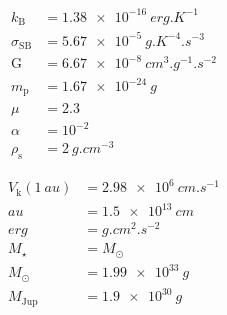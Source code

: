 \begin{multicols}{2}
 \begin{align}
  k_\mathrm{B}       & = \SI{1.38e-16}{erg.K^{-1}}        \\
  \sigma_\mathrm{SB} & = \SI{5.67e-5}{g.K^{-4}.s^{-3}}    \\
  \mathrm{G}         & = \SI{6.67e-8}{cm^3.g^{-1}.s^{-2}} \\
  m_\mathrm{p}       & = \SI{1.67e-24}{g}                 \\
  \mu                & = 2.3                              \\
  \alpha             & = 10^{-2}                          \\
  \rho_\mathrm{s}    & = \SI{2}{g.cm^{-3}}                
 \end{align}
 
 \begin{align}
  V_\mathrm{k}(\SI{1}{au}) & = \SI{2.98e6}{cm.s^{-1}} \\
  \si{au}                  & = \SI{1.5e13}{cm}        \\
  \si{erg}                 & = \si{g.cm^2.s^{-2}}     \\
  M_\star                  & = M_\odot                \\
  M_\odot                  & = \SI{1.99e33}{g}        \\
  M_\mathrm{Jup}           & = \SI{1.9e30}{g}         
 \end{align}
\end{multicols}
